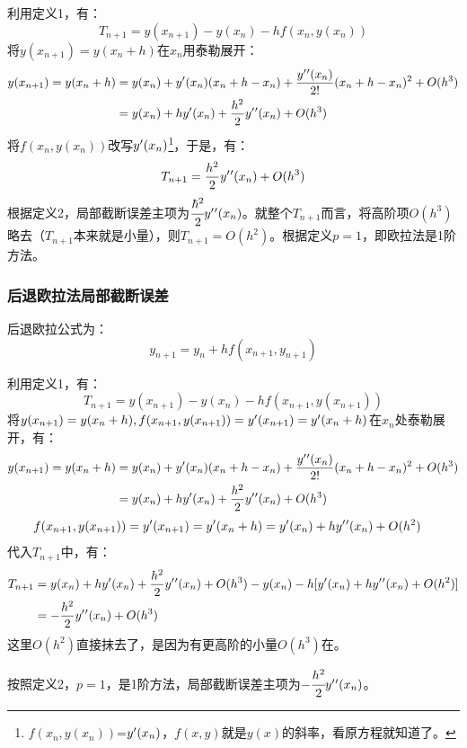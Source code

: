 利用定义1，有：
$$T_{n+1}=y(x_{n+1})-y(x_n)-hf(x_n,y(x_n))$$
将$y(x_{n+1})=y(x_n+h)$在$x_n$用泰勒展开：
\begin{align*}
y(x_{n+1})=y(x_n+h)&=y(x_n)+y\rq{}(x_n)(x_n+h-x_n)+\frac{y\rq{}\rq{}(x_n)}{2!}(x_n+h-x_n)^2+O(h^3)\\
&=y(x_n)+hy\rq{}(x_n)+\frac{h^2}{2}y\rq{}\rq{}(x_n)+O(h^3)
\end{align*}
将$f(x_n,y(x_n))$改写$y\rq{}(x_n)$\footnote{$f(x_n,y(x_n))$=$y\rq{}(x_n)$，$f(x,y)$就是$y(x)$的斜率，看原方程就知道了。}，于是，有：
$$T_{n+1}=\frac{h^2}{2}y\rq{}\rq{}(x_n)+O(h^3)$$
根据定义2，局部截断误差主项为$\cfrac{\hbar^2}{2}y\rq{}\rq{}(x_n)$。就整个$T_{n+1}$而言，将高阶项$O(h^3)$略去（$T_{n+1}$本来就是小量），则$T_{n+1}=O(h^2)$。根据定义$p=1$，即欧拉法是1阶方法。



\subsubsection{后退欧拉法局部截断误差}
后退欧拉公式为：
$$y_{n+1}=y_n+hf(x_{n+1},y_{n+1})$$

利用定义1，有：
$$T_{n+1}=y(x_{n+1})-y(x_n)-hf(x_{n+1},y(x_{n+1}))$$
将$y(x_{n+1})=y(x_n+h),f(x_{n+1},y(x_{n+1}))=y\rq{}(x_{n+1})=y\rq{}(x_n+h)$在$x_n$处泰勒展开，有：
\begin{align*}
y(x_{n+1})=y(x_n+h)&=y(x_n)+y\rq{}(x_n)(x_n+h-x_n)+\frac{y\rq{}\rq{}(x_n)}{2!}(x_n+h-x_n)^2+O(h^3)\\
&=y(x_n)+hy\rq{}(x_n)+\frac{h^2}{2}y\rq{}\rq{}(x_n)+O(h^3)
\end{align*}
\begin{align*}
f(x_{n+1},y(x_{n+1}))&=y\rq{}(x_{n+1})=y\rq{}(x_n+h)
=y\rq{}(x_n)+hy\rq{}\rq{}(x_n)+O(h^2)
\end{align*}
代入$T_{n+1}$中，有：
\begin{align*}
T_{n+1}&=y(x_n)+hy\rq{}(x_n)+\frac{h^2}{2}y\rq{}\rq{}(x_n)+O(h^3)
-y(x_n)-h[y\rq{}(x_n)+hy\rq{}\rq{}(x_n)+O(h^2)]\\
&=-\frac{h^2}{2}y\rq{}\rq{}(x_n)+O(h^3)
\end{align*}
这里$O(h^2)$直接抹去了，是因为有更高阶的小量$O(h^3)$在。

按照定义2，$p=1$，是1阶方法，局部截断误差主项为$-\cfrac{h^2}{2}y\rq{}\rq{}(x_n)$。



